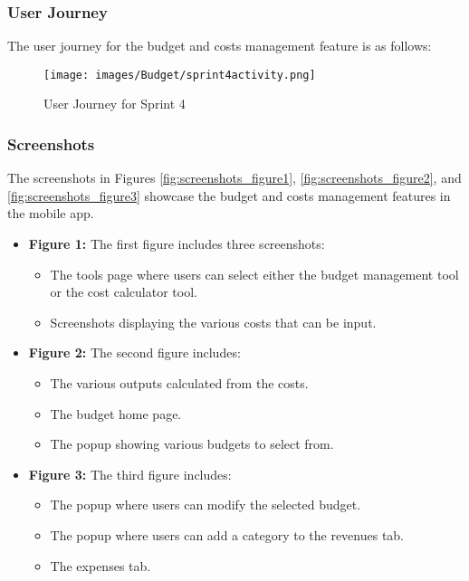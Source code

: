 \subsubsection{User Journey}

The user journey for the budget and costs management feature is as follows:

\begin{figure}[H]
    \centering
    \texttt{[image: images/Budget/sprint4activity.png]}
    \caption{User Journey for Sprint 4}
    \label{fig:activity_sprint4}
\end{figure}

\subsubsection{Screenshots}

The screenshots in Figures \ref{fig:screenshots_figure1}, \ref{fig:screenshots_figure2}, and \ref{fig:screenshots_figure3} showcase the budget and costs management features in the mobile app.

\begin{itemize}
    \item \textbf{Figure 1:} The first figure includes three screenshots:
    \begin{itemize}
        \item The tools page where users can select either the budget management tool or the cost calculator tool.
        \item Screenshots displaying the various costs that can be input.
    \end{itemize}
    
    \item \textbf{Figure 2:} The second figure includes:
    \begin{itemize}
        \item The various outputs calculated from the costs.
        \item The budget home page.
        \item The popup showing various budgets to select from.
    \end{itemize}
    
    \item \textbf{Figure 3:} The third figure includes:
    \begin{itemize}
        \item The popup where users can modify the selected budget.
        \item The popup where users can add a category to the revenues tab.
        \item The expenses tab.
    \end{itemize}
\end{itemize}

